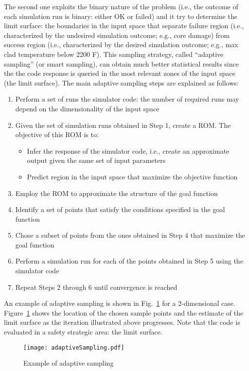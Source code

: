 The second one exploits the binary nature of the problem (i.e., the outcome of each simulation run is binary:
either OK or failed) and it try to determine the limit surface: the boundaries in the input space that separate 
failure region (i.e.,
characterized by the undesired simulation outcome; e.g., core damage) from success region (i.e., characterized 
by the desired simulation outcome; e.g., max clad temperature below 2200 F). 
This sampling strategy, called ``adaptive sampling'' (or smart sampling), can obtain much better statistical results
since the the code response is queried in the most relevant zones of the input space (the limit surface).
The main adaptive sampling steps are explained as follows:
\begin{enumerate}
  \item Perform a set of runs the simulator code: the number of required runs may depend on the dimensionality of 
        the input space
  \item Given the set of simulation runs obtained in Step 1, create a ROM. The objective of this ROM is to:
        \begin{itemize}
          \item Infer the response of the simulator code, i.e., create an approximate output given the same set of input parameters
          \item Predict region in the input space that maximize the objective function
        \end{itemize}
  \item Employ the ROM to approximate the structure of the goal function
  \item Identify a set of points that satisfy the conditions specified in the goal function
  \item Chose a subset of points from the ones obtained in Step 4 that maximize the goal function
  \item Perform a simulation run for each of the points obtained in Step 5 using the simulator code
  \item Repeat Steps 2 through 6 until convergence is reached
\end{enumerate}

An example of adaptive sampling is shown in Fig.~\ref{fig:adaptiveSampling} for a 2-dimensional case. 
Figure~\ref{fig:adaptiveSampling} shows
the location of the chosen sample points and the estimate of the limit surface as the iteration illustrated above 
progresses. Note that the code is evaluated in a safety strategic area: the limit surface. 

\begin{figure}
    \centering
    \centerline{\texttt{[image: adaptiveSampling.pdf]}}
    \caption{Example of adaptive sampling}
    \label{fig:adaptiveSampling}
\end{figure}

   

 



